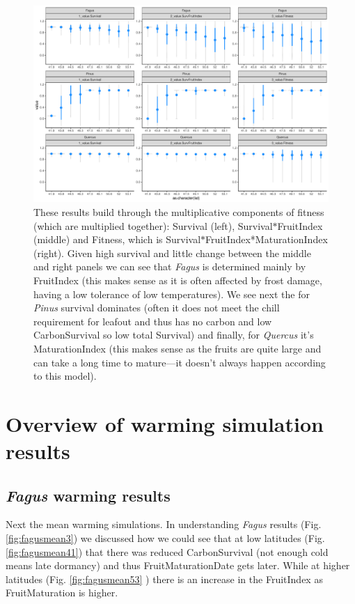 \documentclass[11pt,letter]{article}
\begin{document}
\begin{figure} 
 \begin{center}
\noindent \includegraphics[width=1\textwidth]{..//analyses/graphs/phenofit/historical/fitnessBuildup.pdf}
  \caption{These results build through the multiplicative components of fitness (which are multiplied together): Survival (left), Survival$*$FruitIndex (middle) and Fitness, which is Survival$*$FruitIndex*MaturationIndex (right). Given high survival and little change between the middle and right panels we can see that \emph{Fagus} is determined mainly by FruitIndex (this makes sense as it is often affected by frost damage, having a low tolerance of low temperatures). We see next the for \emph{Pinus} survival dominates (often it does not meet the chill requirement for leafout and thus has no carbon and low CarbonSurvival so low total Survival) and finally, for \emph{Quercus} it's MaturationIndex (this makes sense as the fruits are quite large and can take a long time to mature---it doesn't always happen according to this model). }
  \label{fig:historicalfitnessl}
  \end{center}
\end{figure}

\newpage
\section{Overview of warming simulation results}

\subsection{\emph{Fagus} warming results}
Next the mean warming simulations. In understanding \emph{Fagus} results (Fig. \ref{fig:fagusmean3}) we discussed how we could see that at low latitudes (Fig. \ref{fig:fagusmean41}) that there was reduced CarbonSurvival (not enough cold means late dormancy) and thus FruitMaturationDate gets later. While at higher latitudes (Fig. \ref{fig:fagusmean53} ) there is an increase in the FruitIndex as FruitMaturation is higher. 
\end{document}
